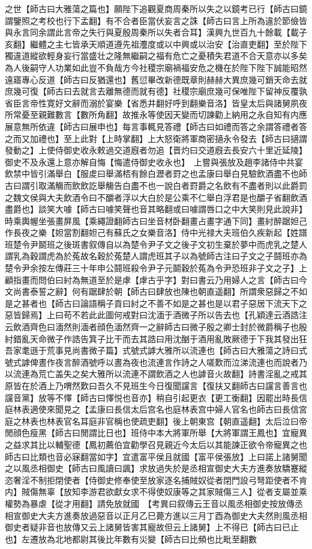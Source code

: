 之世【師古曰大雅蕩之篇也】願陛下追觀夏商周秦所以失之以鏡考已行【師古曰鏡謂鑒照之考校也行下孟翻】有不合者臣當伏妄言之誅【師古曰言上所為違於節儉皆與永言同余謂此言帝之失行與夏殷周秦所以失者合耳】漢興九世百九十餘載【載子亥翻】繼體之主七皆承天順道遵先祖灋度或以中興或以治安【治直吏翻】至於陛下獨違道縱欲輕身妄行當盛壮之隆無繼嗣之福有危亡之憂積失君道不合天意亦以多矣為人後嗣守人功業如此豈不負哉方今社稷宗廟禍福安危之機在於陛下陛下誠能昭然遠寤專心反道【師古曰反猶還也】舊愆畢改新德既章則赫赫大異庶幾可銷天命去就庶幾可復【師古曰去就言去離無德而就有德】社稷宗廟庶幾可保唯陛下留神反覆孰省臣言帝性寛好文辭而溺於宴樂【省悉井翻好呼到翻樂音洛】皆皇太后與諸舅夙夜所常憂至親難數言【數所角翻】故推永等使因天變而切諫勸上納用之永自知有内應展意無所依違【師古曰展申也】每言事輒見答禮【師古曰如禮而答之余謂答禮者答之而又加禮也】至上此對【上時掌翻】上大怒衛將軍商密擿永令發去【師古曰擿謂發動之】上使侍御史收永敕過交道廐者勿追【晋灼曰交道廐去長安六十里近延陵】御史不及永還上意亦解自悔【悔遣侍御史收永也】　上嘗與張放及趙李諸侍中共宴飲禁中皆引滿舉白【服䖍曰舉滿桮有餘白瀝者罸之也孟康曰舉白見驗飲酒盡不也師古曰謂引取滿觴而飲飲訖舉觴告白盡不也一說白者罸爵之名飲有不盡者則以此爵罰之魏文侯與大夫飲酒令曰不釂者浮以大白於是公乘不仁舉白浮君是也釂子省翻飲酒盡爵也】談笑大噱【師古曰噱笑聲也音其略翻或曰噱謂唇口之中大笑則見此說非】時乘輿幄坐張畫屏風【乘繩證翻師古曰坐音材卧翻畫占畫字通下同】畫紂醉踞妲己作長夜之樂【妲當割翻妲己有蘇氏之女樂音洛】侍中光禄大夫班伯久疾新起【姓譜班楚令尹鬬班之後斑書叙傳自以為楚令尹子文之後子文初生棄於夢中而虎乳之楚人謂乳為穀謂虎為於菟故名穀於菟楚人謂虎班其子以為號師古注曰子文之子鬪班亦為楚令尹余按左傳莊三十年申公鬪班殺令尹子元鬬穀於菟為令尹恐班非子文之子】上顧指畫而問伯曰紂為無道至於是虖【虖古乎字】對曰書云乃用婦人之言【師古曰今文尚書泰誓之辭】何有踞肆於朝【師古曰肆放也陳也朝直遥翻】所謂衆惡歸之不如是之甚者也【師古曰論語稱子貢曰紂之不善不如是之甚也是以君子惡居下流天下之惡皆歸焉】上曰苟不若此此圖何戒對曰沈湎于酒微子所以告去也【孔穎達云酒誥注云飲酒齊色曰湎然則湎者顔色湎然齊一之辭師古曰微子殷之卿士封於微爵稱子也殷紂錯亂天命微子作誥告箕子比干而去其誥曰用沈酗于酒用亂敗厥德于下我其發出狂吾家耄遜于荒事見尚書微子篇】式號式謼大雅所以流連也【師古曰大雅蕩之詩曰式號式謼俾晝作夜言醉酒號呼以晝為夜也流連言作詩之人嗟歎而泣涕流連也而說者乃以流連為荒亡盖失之矣大雅所以流連不謂飲酒之人也謼音火故翻】詩書淫亂之戒其原皆在於酒上乃喟然歎曰吾久不見班生今日復聞讜言【復扶又翻師古曰讜言善言也讜音黨】放等不懌【師古曰懌悦也音亦】稍自引起更衣【更工衡翻】因罷出時長信庭林表適使來聞見之【孟康曰長信太后宫名也庭林表宫中婦人官名也師古曰長信宮庭之林表也林表官名耳庭非官稱也使疏吏翻】後上朝東宫【朝直遥翻】太后泣曰帝閒顔色瘦黑【師古曰閒謂比日也】班侍中本大將軍所舉【大將軍謂王鳳也】宜寵異之益求其比以輔聖德【鳳初薦伯宜勸學召見親近今太后以其能諫正欲令帝寵異之也師古曰比類也音必寐翻當如字】宜遣富平侯且就國【富平侯張放】上曰諾上諸舅聞之以風丞相御史【師古曰風讀曰諷】求放過失於是丞相宣御史大夫方進奏放驕蹇縱恣奢淫不制拒閉使者【侍御史修奉使至放家逐名捕賊奴從者閉門設弓弩距使者不肯内】賊傷無辜【放知李游君欲獻女求不得使奴康等之其家賊傷三人】從者支屬並乘權勢為暴虐【從才用翻】請免放就國　【考異曰叙傳云王音以風丞相御史按放傳丞相宣御史大夫方進奏放過惡音以正月乙巳薨方進以三月丁酉為御史大夫然則風丞相御史者疑非音也放傳又云上諸舅皆害其寵故但云上諸舅】上不得已【師古曰已止也】左遷放為北地都尉其後比年數有災變【師古曰比頻也比毗至翻數